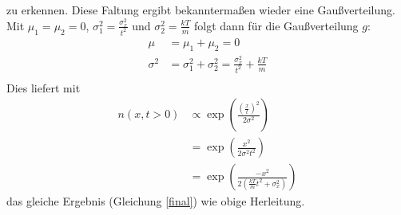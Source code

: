 \documentclass[10pt,a4paper]{extarticle}
\begin{document}
zu erkennen.
Diese Faltung ergibt bekanntermaßen wieder eine Gaußverteilung.
Mit $\mu_1 = \mu_2 = 0$, $\sigma_1^2 = \frac{\sigma_x^2}{t^2}$ und $\sigma_2^2 = \frac{kT}{m}$ folgt dann für die Gaußverteilung $g$:
\begin{align}
\mu &= \mu_1 + \mu_2 = 0 \\
\sigma^2 &= \sigma_1^2 + \sigma_2^2 =  \frac{\sigma_x^2}{t^2} + \frac{kT}{m}\\
\end{align}
Dies liefert mit 
\begin{align}
n(x, t> 0) &\varpropto \exp\left(\frac{\left(\frac{x}{t}\right)^2}{2 \sigma^2}\right) \\
&= \exp\left(\frac{x^2}{2 \sigma^2 t^2}\right) \\
&= \exp\left(\frac{- x^2 }{2\left(\frac{kT}{m}t^2 + \sigma_x^2\right)}\right) 
\end{align}
das gleiche Ergebnis (Gleichung \eqref{final}) wie obige Herleitung.
\end{document}
